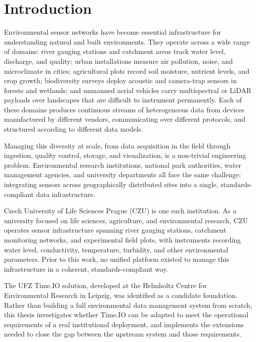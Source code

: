 \chapter*{Introduction}
\label{chap:intro}

Environmental sensor networks have become essential infrastructure for understanding natural and built environments.
They operate across a wide range of domains: river gauging stations and catchment areas track water level, discharge,
and quality; urban installations measure air pollution, noise, and microclimate in cities; agricultural plots record
soil moisture, nutrient levels, and crop growth; biodiversity surveys deploy acoustic and camera-trap sensors in
forests and wetlands; and unmanned aerial vehicles carry multispectral or LiDAR payloads over landscapes that are
difficult to instrument permanently. Each of these domains produces continuous streams of heterogeneous data from
devices manufactured by different vendors, communicating over different protocols, and structured according to
different data models.

Managing this diversity at scale, from data acquisition in the field through ingestion, quality control, storage,
and visualization, is a non-trivial engineering problem. Environmental research institutions, national park
authorities, water management agencies, and university departments all face the same challenge: integrating
sensors across geographically distributed sites into a single, standards-compliant data infrastructure.

Czech University of Life Sciences Prague (CZU) is one such institution. As a university focused on life sciences,
agriculture, and environmental research, CZU operates sensor infrastructure spanning river gauging stations,
catchment monitoring networks, and experimental field plots, with instruments recording water level, conductivity,
temperature, turbidity, and other environmental parameters. Prior to this work, no unified platform existed to manage
this infrastructure in a coherent, standards-compliant way.

The UFZ Time.IO solution, developed at the Helmholtz Centre for Environmental Research in Leipzig, was identified as a
candidate foundation. Rather than building a full environmental data management system from scratch, this thesis
investigates whether Time.IO can be adapted to meet the operational requirements of a real institutional deployment,
and implements the extensions needed to close the gap between the upstream system and those requirements.

